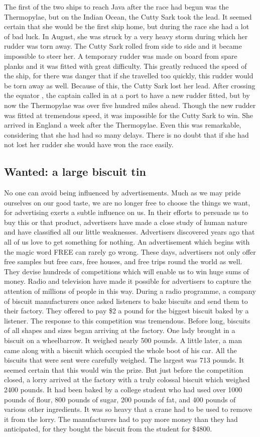 \documentclass[11pt]{article}
\begin{document}
The first of the two ships to reach Java after the race had begun was the Thermopylae, but on the Indian Ocean, the Cutty Sark took the lead. It seemed certain that she would be the first ship home, but during the race she had a lot of bad luck. In August, she was struck by a very heavy storm during which her rudder was torn away. The Cutty Sark rolled from side to side and it became impossible to steer her. A temporary rudder was made on board from spare planks and it was fitted with great difficulty. This greatly reduced the speed of the ship, for there was danger that if she travelled too quickly, this rudder would be torn away as well. Because of this, the Cutty Sark lost her lead. After crossing the equator , the captain called in at a port to have a new rudder fitted, but by now the Thermopylae was over five hundred miles ahead. Though the new rudder was fitted at tremendous speed, it was impossible for the Cutty Sark to win. She arrived in England a week after the Thermopylae. Even this was remarkable, considering that she had had so many delays. There is no doubt that if she had not lost her rudder she would have won the race easily.
\subsection{Wanted: a large biscuit tin}
\label{sec-1-26}

No one can avoid being influenced by advertisements. Much as we may pride ourselves on our good taste, we are no longer free to choose the things we want, for advertising exerts a subtle influence on us. In their efforts to persuade us to buy this or that product, advertisers have made a close study of human nature and have classified all our little weaknesses. Advertisers discovered years ago that all of us love to get something for nothing. An advertisement which begins with the magic word FREE can rarely go wrong. These days, advertisers not only offer free samples but free cars, free houses, and free trips round the world as well. They devise hundreds of competitions which will enable us to win huge sums of money. Radio and television have made it possible for advertisers to capture the attention of millions of people in this way. During a radio programme, a company of biscuit manufacturers once asked listeners to bake biscuits and send them to their factory. They offered to pay \$2 a pound for the biggest biscuit baked by a listener. The response to this competition was tremendous. Before long, biscuits of all shapes and sizes began arriving at the factory. One lady brought in a biscuit on a wheelbarrow. It weighed nearly 500 pounds. A little later, a man came along with a biscuit which occupied the whole boot of his car. All the biscuits that were sent were carefully weighed. The largest was 713 pounds. It seemed certain that this would win the prize. But just before the competition closed, a lorry arrived at the factory with a truly colossal biscuit which weighed 2400 pounds. It had been baked by a college student who had used over 1000 pounds of flour, 800 pounds of sugar, 200 pounds of fat, and 400 pounds of various other ingredients. It was so heavy that a crane had to be used to remove it from the lorry. The manufacturers had to pay more money than they had anticipated, for they bought the biscuit from the student for \$4800. 
\end{document}
